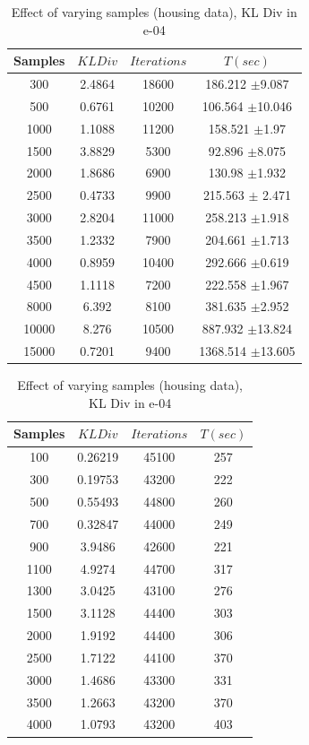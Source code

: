 \documentclass{acm_proc_article-sp}
\begin{document}
\begin{table}[htdp]
\parbox{.39\linewidth}{
\centering
\begin{tabular}{| c | c | c | c |}
\hline
Samples & $KL Div$ & $Iterations$& $T(sec)$ \\
\hline
300 & 2.4864 & 18600 & 186.212 $\pm$9.087  \\
500 & 0.6761 & 10200 & 106.564 $\pm$10.046 \\
1000 & 1.1088 & 11200 & 158.521 $\pm$1.97  \\
1500 & 3.8829 & 5300 & 92.896 $\pm$8.075  \\
2000 & 1.8686 & 6900 & 130.98 $\pm$1.932 \\
2500 & 0.4733 & 9900 & 215.563 $\pm$ 2.471 \\
3000 & 2.8204 & 11000 & 258.213 $\pm1.918$ \\
3500 & 1.2332 & 7900 & 204.661 $\pm$1.713 \\
4000 & 0.8959 & 10400 & 292.666 $\pm$0.619 \\
4500 & 1.1118 & 7200 & 222.558 $\pm$1.967 \\
8000 & 6.392 & 8100 & 381.635 $\pm$2.952  \\
10000 & 8.276 & 10500 & 887.932 $\pm$13.824  \\
15000 & 0.7201 & 9400 & 1368.514 $\pm$13.605  \\
\hline
\end{tabular}
\caption{Effect of varying samples (REDD)}
\label{table:sample1}}
\hfill
\parbox{.65\linewidth}{
\centering
\begin{tabular}{| c | c | c | c |}
\hline
Samples & $KL Div$  & $Iterations$ & $T(sec)$\\
\hline
100 & 0.26219 & 45100 & 257  \\
300 & 0.19753 & 43200 & 222 \\
500 & 0.55493 & 44800 & 260  \\
700 & 0.32847 & 44000 & 249 \\
900 & 3.9486 & 42600 & 221  \\
1100 & 4.9274 & 44700 & 317  \\
1300 & 3.0425 & 43100 & 276 \\
1500 &  3.1128 & 44400 & 303 \\
2000 & 1.9192 & 44400 & 306 \\
2500 & 1.7122 & 44100 & 370 \\
3000 & 1.4686 & 43300 & 331 \\
3500 & 1.2663 & 43200 & 370  \\
4000 & 1.0793 & 43200 & 403  \\
\hline
\end{tabular}
\caption{Effect of varying samples (housing data), KL Div in e-04}
\label{table:sample2}}
\end{table}
\end{document}
